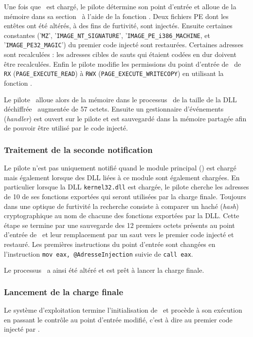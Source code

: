 Une fois que \services\ est chargé, le pilote détermine son point d'entrée et alloue de la mémoire dans sa section \pdata\ à l'aide de la fonction \ZwA.
Deux fichiers PE dont les entêtes ont été altérés, à des fins de furtivité, sont injectés.
Ensuite certaines constantes ('\texttt{MZ}', '\texttt{IMAGE\_NT\_SIGNATURE}', '\texttt{IMAGE\_PE\_i386\_MACHINE}, et '\texttt{IMAGE\_PE32\_MAGIC}') du premier code injecté sont restaurées.
Certaines adresses sont recalculées : les adresses cibles de sauts qui étaient codées en dur doivent être recalculées.
Enfin le pilote modifie les permissions du point d'entrée de \services\ de \texttt{RX} (\texttt{PAGE\_EXECUTE\_READ}) à \texttt{RWX} (\texttt{PAGE\_EXECUTE\_WRITECOPY}) en utilisant la fonction \ZwP.

Le pilote \driver\ alloue alors de la mémoire dans le processus \services\ de la taille de la DLL déchiffrée \netpDLL\ augmentée de 57 octets.
Ensuite un gestionnaire d’événements (\emph{handler}) est ouvert sur le pilote et est sauvegardé dans la mémoire partagée afin de pouvoir être utilisé par le code injecté.

\subsubsection{Traitement de la seconde notification}
Le pilote n'est pas uniquement notifié quand le module principal (\services) est chargé mais également lorsque des DLL liées à ce module sont également chargées.
En particulier lorsque la DLL \texttt{kernel32.dll} est chargée, le pilote cherche les adresses de 10 de ses fonctions exportées qui seront utilisées par la charge finale.
Toujours dans une optique de furtivité la recherche consiste à comparer un haché (\emph{hash}) cryptographique au nom de chacune des fonctions exportées par la DLL.
Cette étape se termine par une sauvegarde des 12 premiers octets présents au point d'entrée de \services\ et leur remplacement par un saut vers le premier code injecté et restauré.
Les premières instructions du point d'entrée sont changées en l'instruction \texttt{mov eax, @AdresseInjection} suivie de \texttt{call eax}.

Le processus \services\ a ainsi été altéré et est prêt à lancer la charge finale.

\subsubsection{Lancement de la charge finale}
Le système d'exploitation termine l'initialisation de \services\ et procède à son exécution en passant le contrôle au point d'entrée modifié, c'est à dire au premier code injecté par \duqu.

